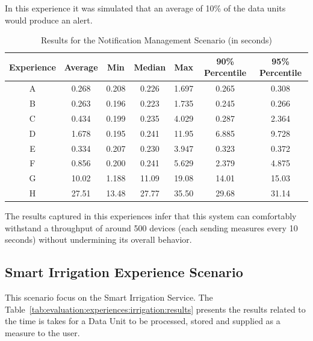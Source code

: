 In this experience it was simulated that an average of 10\% of the data units would produce an alert.

\begin{table}[H]
    \caption{Results for the Notification Management Scenario (in seconds)}
    \label{tab:evaluation:experiences:notification:results}
    \centering
    \begin{tabular}{@{}ccccccc@{}}
    \toprule
    \textbf{Experience} & \textbf{Average} & \textbf{Min} & \textbf{Median} & \textbf{Max} & \textbf{90\% Percentile} & \textbf{95\% Percentile} \\ \midrule
    A & 0.268 & 0.208 & 0.226 & 1.697 & 0.265 & 0.308 \\ \midrule
    B & 0.263 & 0.196 & 0.223 & 1.735 & 0.245 & 0.266 \\ \midrule
    C & 0.434 & 0.199 & 0.235 & 4.029 & 0.287 & 2.364 \\ \midrule
    D & 1.678 & 0.195 & 0.241 & 11.95 & 6.885 & 9.728 \\ \midrule
    E & 0.334 & 0.207 & 0.230 & 3.947 & 0.323 & 0.372 \\ \midrule
    F & 0.856 & 0.200 & 0.241 & 5.629 & 2.379 & 4.875 \\ \midrule
    G & 10.02 & 1.188 & 11.09 & 19.08 & 14.01 & 15.03 \\ \midrule
    H & 27.51 & 13.48 & 27.77 & 35.50 & 29.68 & 31.14 \\ \bottomrule
    \end{tabular}
\end{table}

The results captured in this experiences infer that this system can comfortably withstand a throughput of around 500 devices (each sending measures every 10 seconds) without undermining its overall behavior.

\subsection{Smart Irrigation Experience Scenario}
\label{subsec:evaluation:experiences:irrigation}

This scenario focus on the Smart Irrigation Service. The Table~\ref{tab:evaluation:experiences:irrigation:results} presents the results related to the time is takes for a Data Unit to be processed, stored and supplied as a measure to the user.


